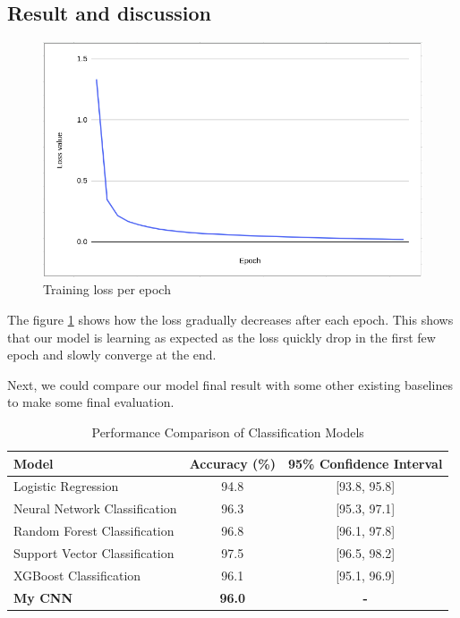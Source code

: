 \documentclass[conference]{IEEEtran}
\begin{document}
\subsection{Result and discussion}
\begin{figure}
    \centering
    \includegraphics[width=1\linewidth]{training.png}
    \caption{Training loss per epoch}
    \label{fig:train_loss}
\end{figure}

The figure \ref{fig:train_loss} shows how the loss gradually decreases after each epoch. This shows that our model is learning as expected as the loss quickly drop in the first few epoch and slowly converge at the end.

Next, we could compare our model final result with some other existing baselines to make some final evaluation.
\begin{table}[H]
\centering
\begin{tabular}{|l|c|c|}
\hline
\textbf{Model} & \textbf{Accuracy (\%)} & \textbf{95\% Confidence Interval} \\
\hline
Logistic Regression & 94.8 & [93.8, 95.8] \\
Neural Network Classification & 96.3 & [95.3, 97.1] \\
Random Forest Classification & 96.8 & [96.1, 97.8] \\
Support Vector Classification & 97.5 & [96.5, 98.2] \\
XGBoost Classification & 96.1 & [95.1, 96.9] \\
\hline
\textbf{My CNN} & \textbf{96.0} & \textbf{-} \\
\hline
\end{tabular}
\vspace{0.2cm}
\caption{Performance Comparison of Classification Models}
\label{tab:model_comparison}
\end{table}
\end{document}
